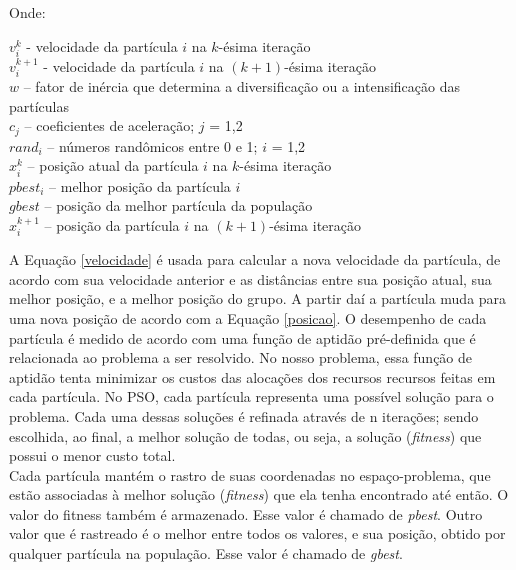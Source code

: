 \documentclass[a4paper,10pt]{article}
\begin{document}
Onde:\\

\begin{description}
\item
$v_{i}^k$ - velocidade da partícula $i$ na $k$-ésima iteração\\
$v_{i}^{k+1}$ - velocidade da partícula $i$ na $(k+1)$-ésima iteração\\
$w$ – fator de inércia que determina a diversificação ou a intensificação das partículas\\
$c_{j}$ – coeficientes de aceleração; $j$ = 1,2\\
$rand_{i}$ – números randômicos entre 0 e 1; $i$ = 1,2\\
$x_{i}^k$ – posição atual da partícula $i$ na $k$-ésima iteração\\
$pbest_{i}$ – melhor posição da partícula $i$\\
$gbest$ – posição da melhor partícula da população\\
$x_{i}^{k+1}$ – posição da partícula $i$ na $(k+1)$-ésima iteração\\
\end{description}

A Equação \eqref{velocidade} é usada para calcular a nova velocidade da partícula, de acordo com sua velocidade 
anterior e as distâncias entre sua posição atual, sua melhor posição, e a melhor posição do grupo. 
A partir daí a partícula muda para uma nova posição de acordo com a Equação \eqref{posicao}. O desempenho de cada 
partícula é medido de acordo com uma função de aptidão pré-definida que é relacionada ao problema a ser 
resolvido. No nosso problema, essa função de aptidão tenta minimizar os custos das alocações dos recursos 
recursos feitas em cada partícula. No PSO, cada partícula representa uma possível solução para o problema.
Cada uma dessas soluções é refinada através de n iterações; sendo escolhida, ao final, a melhor solução de todas,
ou seja, a solução (\emph{fitness}) que possui o menor custo total.\\

Cada partícula mantém o rastro de suas coordenadas no espaço-problema, que estão associadas à 
melhor solução (\emph{fitness}) que ela tenha encontrado até então. O valor do fitness também é armazenado. 
Esse valor é chamado de \emph{pbest}. Outro valor que é rastreado é o melhor entre todos os valores, e sua posição, 
obtido por qualquer partícula na população. Esse valor é chamado de \emph{gbest}.\\
\end{document}
